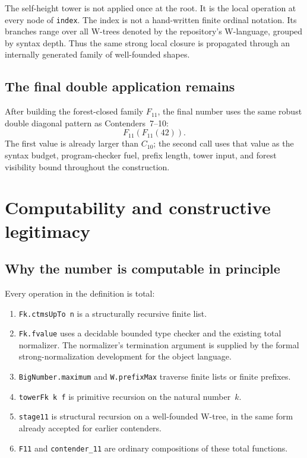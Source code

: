 \documentclass[11pt]{article}
\theoremstyle{definition}
\theoremstyle{remark}
\newcommand{\Cten}{\ensuremath{C_{10}}}
\newcommand{\code}[1]{\texttt{#1}}
\begin{document}
The self-height tower is not applied once at the root. It is the local
operation at every node of \code{index}. The index is not a hand-written
finite ordinal notation. Its branches range over all W-trees denoted by the
repository's W-language, grouped by syntax depth. Thus the same strong local
closure is propagated through an internally generated family of well-founded
shapes.

\subsection{The final double application remains}

After building the forest-closed family $F_{11}$, the final number uses the
same robust double diagonal pattern as Contenders~7--10:
\[
  F_{11}(F_{11}(42)).
\]
The first value is already larger than \Cten; the second call uses that value
as the syntax budget, program-checker fuel, prefix length, tower input, and
forest visibility bound throughout the construction.

\section{Computability and constructive legitimacy}

\subsection{Why the number is computable in principle}

Every operation in the definition is total:

\begin{enumerate}[leftmargin=*]
\item \code{Fk.ctmsUpTo n} is a structurally recursive finite list.
\item \code{Fk.fvalue} uses a decidable bounded type checker and the existing
  total normalizer. The normalizer's termination argument is supplied by the
  formal strong-normalization development for the object language.
\item \code{BigNumber.maximum} and \code{W.prefixMax} traverse finite lists or
  finite prefixes.
\item \code{towerFk k f} is primitive recursion on the natural number~$k$.
\item \code{stage11} is structural recursion on a well-founded W-tree, in the
  same form already accepted for earlier contenders.
\item \code{F11} and \code{contender\_11} are ordinary compositions of these
  total functions.
\end{enumerate}
\end{document}
